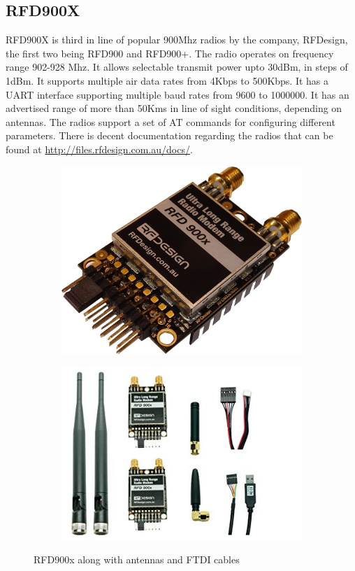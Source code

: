 \subsection{RFD900X}
RFD900X is third in line of popular 900Mhz radios by the company, RFDesign, the first two being RFD900 and RFD900+. The radio operates on frequency range 902-928 Mhz. It allows selectable transmit power upto 30dBm, in steps of 1dBm. It supports multiple air data rates from 4Kbps to 500Kbps. It has a UART interface supporting multiple baud rates from 9600 to 1000000. It has an advertised range of more than 50Kms in line of sight conditions, depending on antennas. The radios support a set of AT commands for configuring different parameters. There is decent documentation regarding the radios that can be found at \url{http://files.rfdesign.com.au/docs/}.

\begin{figure}[h]
	\centering
	\begin{subfigure}{0.5\textwidth}
		\centering
		\includegraphics[scale=0.1]{Pictures/rfd1.jpg}
	\end{subfigure}%
	\begin{subfigure}{0.5\textwidth}
		\centering
		\includegraphics[scale=0.5]{Pictures/rfd2.jpg}
	\end{subfigure}
	\caption{RFD900x along with antennas and FTDI cables}
	\label{fig: rfd900x}
\end{figure}

